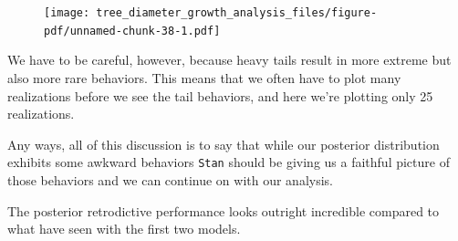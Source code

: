 \documentclass[
  letterpaper,
  DIV=11,
  numbers=noendperiod]{scrartcl}
\begin{document}
\begin{figure}[H]

{\centering \texttt{[image: tree\_diameter\_growth\_analysis\_files/figure-pdf/unnamed-chunk-38-1.pdf]}

}

\end{figure}

We have to be careful, however, because heavy tails result in more
extreme but also more rare behaviors. This means that we often have to
plot many realizations before we see the tail behaviors, and here we're
plotting only 25 realizations.

Any ways, all of this discussion is to say that while our posterior
distribution exhibits some awkward behaviors \texttt{Stan} should be
giving us a faithful picture of those behaviors and we can continue on
with our analysis.

The posterior retrodictive performance looks outright incredible
compared to what have seen with the first two models.
\end{document}
